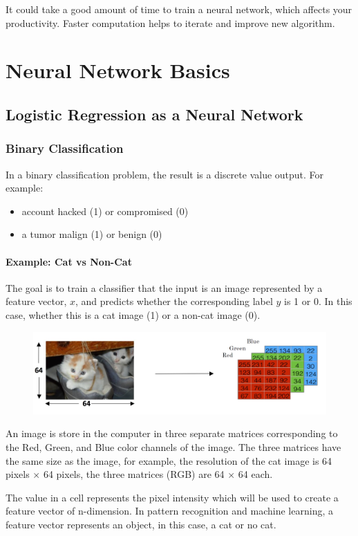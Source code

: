 \documentclass[UTF8]{article}
\begin{document}
It could take a good amount of time to train a neural network, which affects your productivity.
Faster computation helps to iterate and improve new algorithm.

\section{Neural Network Basics}
\subsection{Logistic Regression as a Neural Network}
\subsubsection{Binary Classification}
In a binary classification problem, the result is a discrete value output. For example:
\begin{itemize}
    \item account hacked (1) or compromised (0)
    \item a tumor malign (1) or benign (0)
\end{itemize}

\paragraph{Example: Cat vs Non-Cat}
The goal is to train a classifier that the input is an image represented by a feature vector,
$x$, and predicts whether the corresponding label $y$ is 1 or 0. In this case,
whether this is a cat image (1) or a non-cat image (0).

\begin{figure}[ht]
    \centering
    \includegraphics[width=35em]{figures/1-cat}
\end{figure}
An image is store in the computer in three separate matrices corresponding to the Red, Green, and
Blue color channels of the image. The three matrices have the same size as the image, for example,
the resolution of the cat image is 64 pixels $\times$ 64 pixels, the three matrices (RGB) are 64
$\times$ 64 each.

The value in a cell represents the pixel intensity which will be used to create a feature vector of
n-dimension. In pattern recognition and machine learning, a feature vector represents an object, in
this case, a cat or no cat.
\end{document}
